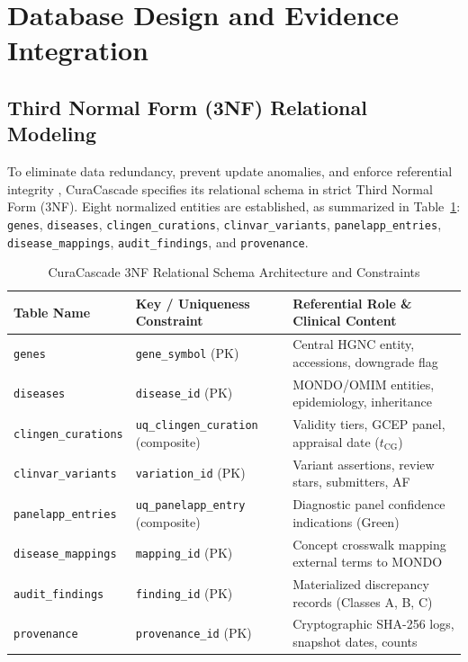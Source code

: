 \documentclass[conference]{IEEEtran}
\begin{document}
\section{Database Design and Evidence Integration}
\subsection{Third Normal Form (3NF) Relational Modeling}
To eliminate data redundancy, prevent update anomalies, and enforce referential integrity \cite{codd1970relational}, CuraCascade specifies its relational schema in strict Third Normal Form (3NF). Eight normalized entities are established, as summarized in Table~\ref{tab:schema}: \texttt{genes}, \texttt{diseases}, \texttt{clingen\_curations}, \texttt{clinvar\_variants}, \texttt{panelapp\_entries}, \texttt{disease\_mappings}, \texttt{audit\_findings}, and \texttt{provenance}.

\begin{table}[t]
\caption{CuraCascade 3NF Relational Schema Architecture and Constraints}
\label{tab:schema}
\centering
\begin{tabularx}{\columnwidth}{lXX}
\toprule
\textbf{Table Name} & \textbf{Key / Uniqueness Constraint} & \textbf{Referential Role \& Clinical Content} \\
\midrule
\texttt{genes} & \texttt{gene\_symbol} (PK) & Central HGNC entity, accessions, downgrade flag \\
\texttt{diseases} & \texttt{disease\_id} (PK) & MONDO/OMIM entities, epidemiology, inheritance \\
\texttt{clingen\_curations} & \texttt{uq\_clingen\_curation} (composite) & Validity tiers, GCEP panel, appraisal date ($t_{\text{CG}}$) \\
\texttt{clinvar\_variants} & \texttt{variation\_id} (PK) & Variant assertions, review stars, submitters, AF \\
\texttt{panelapp\_entries} & \texttt{uq\_panelapp\_entry} (composite) & Diagnostic panel confidence indications (Green) \\
\texttt{disease\_mappings} & \texttt{mapping\_id} (PK) & Concept crosswalk mapping external terms to MONDO \\
\texttt{audit\_findings} & \texttt{finding\_id} (PK) & Materialized discrepancy records (Classes A, B, C) \\
\texttt{provenance} & \texttt{provenance\_id} (PK) & Cryptographic SHA-256 logs, snapshot dates, counts \\
\bottomrule
\end{tabularx}
\end{table}
\end{document}

